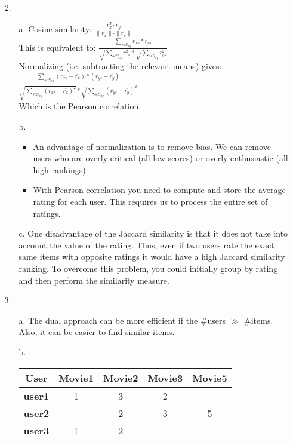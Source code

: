 \documentclass{article}
\begin{document}
\begin{itemize}
\pagebreak
\item[2.]
	\begin{itemize}
		\item[a.] Cosine similarity: $\frac{r_{x}^{T}\cdot r_{y}}{\parallel r_{x} \parallel \cdot \parallel r_{y} \parallel}$\\
		 This is equivalent to: 
		 	$\frac{\sum_{s \epsilon S_{xy}} r_{xs}*r_{ys}}{\sqrt{\sum_{s \epsilon S_{xy}} r_{xs}^{2}} * \sqrt{\sum_{s \epsilon S_{xy}} r_{ys}^{2}}}$\\
		 Normalizing (i.e. subtracting the relevant means) gives:
		 	$\frac{\sum_{s \epsilon S_{xy}} (r_{xs} - \bar{r_{x}})*(r_{ys}-\bar{r_{y}})}{\sqrt{\sum_{s \epsilon S_{xy}} (r_{xs} - \bar{r_{x}})^{2}} * \sqrt{\sum_{s \epsilon S_{xy}} (r_{ys}-\bar{r_{y}})^{2}}}$\\
		 	Which is the Pearson correlation.
		\item[b.] 
			\begin{itemize}
				\item An advantage of normalization is to remove bias. We can remove users who are overly critical (all low scores) or overly enthusiastic (all high rankings)
				\item With Pearson correlation you need to compute and store the average rating for each user. This requires us to process the entire set of ratings.
			\end{itemize}
		\item[c.] One disadvantage of the Jaccard similarity is that it does not take into account the value of the rating. Thus, even if two users rate the exact same items with opposite ratings it would have a high Jaccard similarity ranking. To overcome this problem, you could initially group by rating and then perform the similarity measure. 
	\end{itemize}

\pagebreak
\item[3.]
	\begin{itemize}
		\item[a.] The dual approach can be more efficient if the \#users $\gg$ \#items. Also, it can be easier to find similar items.
		\item[b.]
			\begin{tabular}{|c||c|c|c|c|}
			\hline 
				\textbf{User} & \textbf{Movie1} & \textbf{Movie2} & \textbf{Movie3} & \textbf{Movie5}\\
			\hline
				\textbf{user1} & 1 & 3 & 2 & \\
				\textbf{user2} &  & 2 & 3 & 5\\
				\textbf{user3} & 1 & 2 &  & \\
			\hline
			\end{tabular}


\end{itemize}
\end{itemize}
\end{document}
